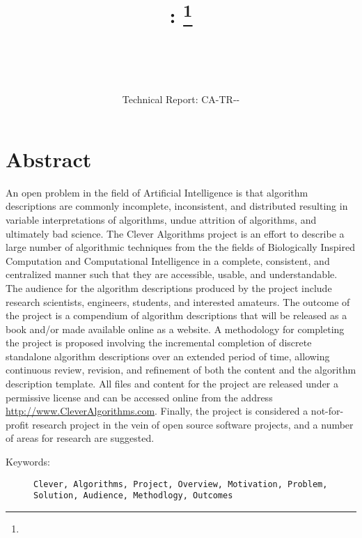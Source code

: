 \documentclass[a4paper, 11pt]{article}
\title{{\myreporttitle}: {\myreportsubtitle}\footnote{\myreportlicense}}
\author{\myreportauthor\\{\myreportemail}\\\small\myreportproject}
\date{\myreportfulldate\\{\small{Technical Report: CA-TR-{\myreportdate}-\myreportversion}}}
\begin{document}
\maketitle

\section*{Abstract} 
An open problem in the field of Artificial Intelligence is that algorithm descriptions are commonly incomplete, inconsistent, and distributed resulting in variable interpretations of algorithms, undue attrition of algorithms, and ultimately bad science. 
The Clever Algorithms project is an effort to describe a large number of algorithmic techniques from the the fields of Biologically Inspired Computation and Computational Intelligence in a complete, consistent, and centralized manner such that they are accessible, usable, and understandable. 
The audience for the algorithm descriptions produced by the project include research scientists, engineers, students, and interested amateurs.
The outcome of the project is a compendium of algorithm descriptions that will be released as a book and/or made available online as a website.
A methodology for completing the project is proposed involving the incremental completion of discrete standalone algorithm descriptions over an extended period of time, allowing continuous review, revision, and refinement of both the content and the algorithm description template.
All files and content for the project are released under a permissive license and can be accessed online from the address \url{http://www.CleverAlgorithms.com}.
Finally, the project is considered a not-for-profit research project in the vein of open source software projects, and a number of areas for research are suggested. 

\begin{description}
	\item[Keywords:] {\small\texttt{Clever, Algorithms, Project, Overview, Motivation, Problem, Solution, Audience, Methodlogy, Outcomes}}
\end{description} 

\end{document}

